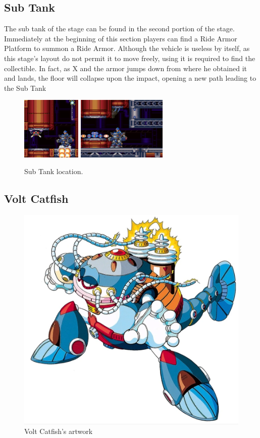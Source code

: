 \subsection{Sub Tank}
The sub tank of the stage can be found in the second portion of the stage. Immediately at the beginning of this section players can find a Ride Armor Platform to summon a Ride Armor. Although the vehicle is useless by itself, as this stage's layout do not permit it to move freely, using it is required to find the collectible. In fact, as X and the armor jumps down from where he obtained it and lands, the floor will collapse upon the impact, opening a new path leading to the Sub Tank
\begin{figure}[htp]
	\centering
	\includegraphics[height=3cm]{figures/X3/Volt_catfish/tank_1.jpg}
	\includegraphics[height=3cm]{figures/X3/Volt_catfish/tank_2.jpg}
	\caption{Sub Tank location.}
\end{figure}

\subsection{Volt Catfish}\label{boss:Volt_catfish}
\begin{figure}[htp]
	\centering
	\includegraphics[height=\portraitsize]{figures/X3/Volt_catfish/voltcatfish.png}
	\caption{Volt Catfish's artwork~\cite{book:MMX_Complete_art}}
\end{figure}

